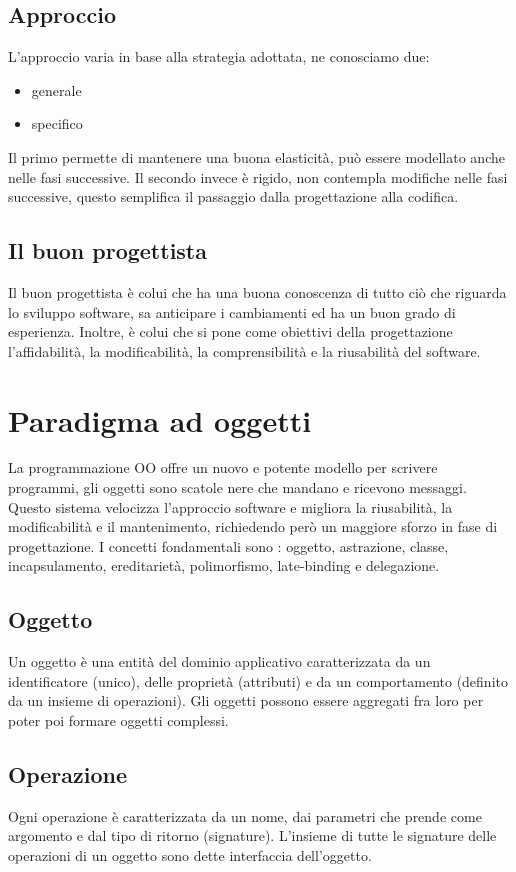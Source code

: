 \documentclass[a4paper,12pt]{report}
\begin{document}
	\section{Approccio}
	L'approccio varia in base alla strategia adottata, ne conosciamo due:
	\begin{itemize}
		\item generale
		\item specifico
	\end{itemize}
	Il primo permette di mantenere una buona elasticità, può essere modellato anche nelle fasi successive. Il secondo invece è rigido, non contempla modifiche nelle fasi successive, questo semplifica il passaggio dalla progettazione alla codifica.
	\section{Il buon progettista}
	Il buon progettista è colui che ha una buona conoscenza di tutto ciò che riguarda lo sviluppo software, sa anticipare i cambiamenti ed ha un buon grado di esperienza. Inoltre, è colui che si pone come obiettivi della progettazione l'affidabilità, la modificabilità, la comprensibilità e la riusabilità del software.	
	\newpage
	\chapter{Paradigma ad oggetti}
	La programmazione OO offre un nuovo e potente modello per scrivere programmi, gli oggetti sono scatole nere che mandano e ricevono messaggi. Questo sistema velocizza l'approccio software e migliora la riusabilità, la modificabilità e il mantenimento, richiedendo però un maggiore sforzo in fase di progettazione. I concetti fondamentali sono : oggetto, astrazione, classe, incapsulamento, ereditarietà, polimorfismo, late-binding e delegazione.
	\section{Oggetto}
	Un oggetto è una entità del dominio applicativo caratterizzata da un identificatore (unico), delle proprietà (attributi) e da un comportamento (definito da un insieme di operazioni). Gli oggetti possono essere aggregati fra loro per poter poi formare oggetti complessi.
	\section{Operazione}
	Ogni operazione è caratterizzata da un nome, dai parametri che prende come argomento e dal tipo di ritorno (signature). L'insieme di tutte le signature delle operazioni di un oggetto sono dette interfaccia dell'oggetto.
\end{document}
